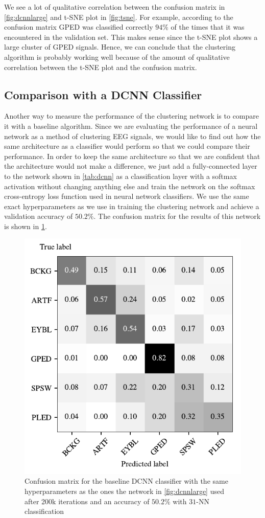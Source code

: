 We see a lot of qualitative correlation between the confusion matrix in \cref{fig:dcnnlarge} and t-SNE plot in \cref{fig:tsne}. For example, according to the confusion matrix GPED was classified correctly $94\%$ of the times that it was encountered in the validation set. This makes sense since the t-SNE plot shows a large cluster of GPED signals. Hence, we can conclude that the clustering algorithm is probably working well because of the amount of qualitative correlation between the t-SNE plot and the confusion matrix.


\subsection{Comparison with a DCNN Classifier}
Another way to measure the performance of the clustering network is to compare it with a baseline algorithm. Since we are evaluating the performance of a neural network as a method of clustering EEG signals, we would like to find out how the same architecture as a classifier would perform so that we could compare their performance. In order to keep the same architecture so that we are confident that the architecture would not make a difference, we just add a fully-connected layer to the network shown in \cref{tab:dcnn} as a classification layer with a softmax activation without changing anything else and train the network on the softmax cross-entropy loss function used in neural network classifiers. We use the same exact hyperparameters as we use in training the clustering network and achieve a validation accuracy of $50.2\%$. The confusion matrix for the results of this network is shown in \cref{fig:dcnnclasslarge}. 

\begin{figure}[!ht]
	\centering
	\includegraphics[width=0.55\linewidth]{pictures/conf_mat_baseline.pdf}
	\caption[Confusion matrix for the baseline DCNN classifier]{Confusion matrix for the baseline DCNN classifier with the same hyperparameters as the ones the network in \cref{fig:dcnnlarge} used after 200k iterations and an accuracy of $50.2\%$ with $31$-NN classification}\label{fig:dcnnclasslarge}  
\end{figure}

